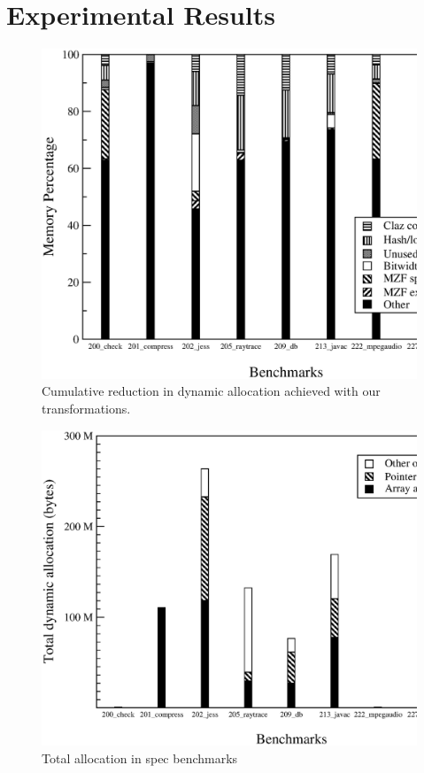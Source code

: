 \documentclass[preprint]{acmconf}
\begin{document}
\section{Experimental Results}
\begin{figure}
\includegraphics[scale=0.32,clip=true]{Figures/spaceopt.eps}
\caption{Cumulative reduction in dynamic allocation achieved with
  our transformations.}
\label{fig:total}
\end{figure}
\begin{figure}
\includegraphics[scale=0.32,clip=true]{Figures/spec-space.eps}
\caption{Total allocation in spec benchmarks}
\label{fig:space}
\end{figure}
\end{document}
